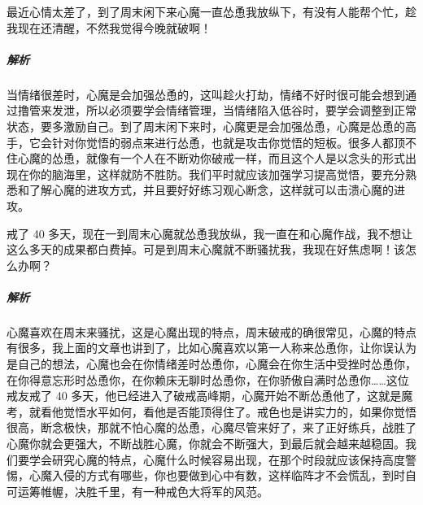 \begin{case}[破心中贼]
    最近心情太差了，到了周末闲下来心魔一直怂恿我放纵下，有没有人能帮个忙，趁我现在还清醒，不然我觉得今晚就破啊！
    \subparagraph{解析} 当情绪很差时，心魔是会加强怂恿的，这叫趁火打劫，情绪不好时很可能会想到通过撸管来发泄，所以必须要学会情绪管理，当情绪陷入低谷时，要学会调整到正常状态，要多激励自己。到了周末闲下来时，心魔更是会加强怂恿，心魔是怂恿的高手，它会针对你觉悟的弱点来进行怂恿，也就是攻击你觉悟的短板。很多人都顶不住心魔的怂恿，就像有一个人在不断劝你破戒一样，而且这个人是以念头的形式出现在你的脑海里，这样就防不胜防。我们平时就应该加强学习提高觉悟，要充分熟悉和了解心魔的进攻方式，并且要好好练习观心断念，这样就可以击溃心魔的进攻。
\end{case}

\begin{case}[研究心魔的特点]
    戒了 40 多天，现在一到周末心魔就怂恿我放纵，我一直在和心魔作战，我不想让这么多天的成果都白费掉。可是到周末心魔就不断骚扰我，我现在好焦虑啊！该怎么办啊？
    \subparagraph{解析} 心魔喜欢在周末来骚扰，这是心魔出现的特点，周末破戒的确很常见，心魔的特点有很多，我上面的文章也讲到了，比如心魔喜欢以第一人称来怂恿你，让你误认为是自己的想法，心魔也会在你情绪差时怂恿你，心魔会在你生活中受挫时怂恿你，在你得意忘形时怂恿你，在你赖床无聊时怂恿你，在你骄傲自满时怂恿你……这位戒友戒了 40 多天，他已经进入了破戒高峰期，心魔开始不断怂恿他了，这就是魔考，就看他觉悟水平如何，看他是否能顶得住了。戒色也是讲实力的，如果你觉悟很高，断念极快，那就不怕心魔的怂恿，心魔尽管来好了，来了正好练兵，战胜了心魔你就会更强大，不断战胜心魔，你就会不断强大，到最后就会越来越稳固。我们要学会研究心魔的特点，心魔什么时候容易出现，在那个时段就应该保持高度警惕，心魔入侵的方式有哪些，你也要做到心中有数，这样临阵才不会慌乱，到时自可运筹帷幄，决胜千里，有一种戒色大将军的风范。
\end{case}


